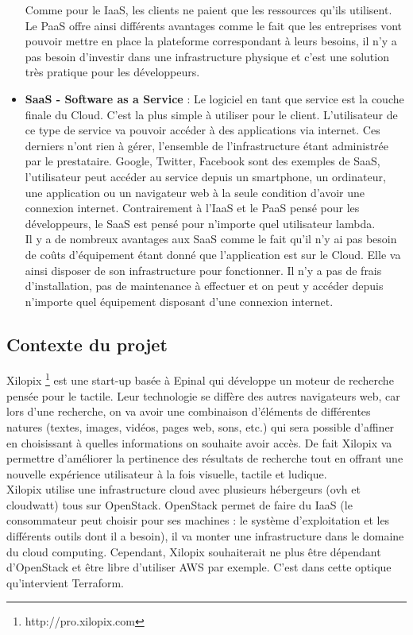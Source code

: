 \documentclass[]{article}
\begin{document}
\begin{itemize}
Comme pour le IaaS, les clients ne paient que les ressources qu'ils utilisent.
Le PaaS offre ainsi différents avantages comme le fait que les entreprises vont pouvoir mettre en place la plateforme correspondant à leurs besoins, il n'y a pas besoin d'investir dans une infrastructure physique et c'est une solution très pratique pour les développeurs.
\item \textbf{SaaS - Software as a Service} : Le logiciel en tant que service est la couche finale du Cloud. C'est la plus simple à utiliser pour le client. L'utilisateur de ce type de service va pouvoir accéder à des applications via internet. Ces derniers n'ont rien à gérer, l'ensemble de l'infrastructure étant administrée par le prestataire. Google, Twitter, Facebook sont des exemples de SaaS, l'utilisateur peut accéder au service depuis un smartphone, un ordinateur, une application ou un navigateur web à la seule condition d'avoir une connexion internet. Contrairement à l'IaaS et le PaaS pensé pour les développeurs, le SaaS est pensé pour n'importe quel utilisateur lambda.\\
Il y a de nombreux avantages aux SaaS comme le fait qu'il n'y ai pas besoin de coûts d'équipement étant donné que l'application est sur le Cloud. Elle va ainsi disposer de son infrastructure pour fonctionner. Il n'y a pas de frais d'installation, pas de maintenance à effectuer et on peut y accéder depuis n'importe quel équipement disposant d'une connexion internet.
\end{itemize}

\subsection{Contexte du projet}\label{contexte-du-projet}

Xilopix \footnote{http://pro.xilopix.com} est une start-up basée à Epinal qui
développe un moteur de recherche pensée pour le tactile. Leur
technologie se diffère des autres navigateurs web, car lors d'une
recherche, on va avoir une combinaison d'éléments de différentes natures
(textes, images, vidéos, pages web, sons, etc.) qui
sera possible d'affiner en choisissant à quelles informations on souhaite avoir
accès. De fait Xilopix va permettre d'améliorer la pertinence des
résultats de recherche tout en offrant une nouvelle expérience
utilisateur à la fois visuelle, tactile et ludique.\\
Xilopix utilise une infrastructure cloud avec plusieurs hébergeurs (ovh et cloudwatt) tous
sur OpenStack. OpenStack permet de faire du IaaS (le consommateur peut
choisir pour ses machines : le système d'exploitation et les différents
outils dont il a besoin), il va monter une infrastructure dans le
domaine du cloud computing. Cependant, Xilopix souhaiterait ne plus être
dépendant d'OpenStack et être libre d'utiliser AWS par exemple. C'est
dans cette optique qu'intervient Terraform.
\end{document}
